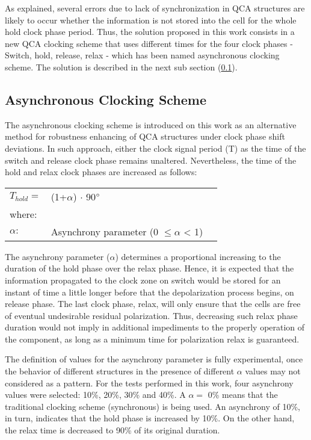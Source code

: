 As explained, several errors due to lack of synchronization in QCA structures are likely to occur whether the information is not stored into the cell for the whole hold clock phase period. Thus, the solution proposed in this work consists in a new QCA clocking scheme that uses different times for the four clock phases - Switch, hold, release, relax - which has been named asynchronous clocking scheme. The solution is described in the next sub section (\ref{Asynchronous_Clocking_Scheme}).

\subsection{Asynchronous Clocking Scheme}
\label{Asynchronous_Clocking_Scheme}

The asynchronous clocking scheme is introduced on this work as an alternative method for robustness enhancing of QCA structures under clock phase shift deviations. In such approach, either the clock signal period (T) as the time of the switch and release clock phase remains unaltered. Nevertheless, the time of the hold and relax clock phases are increased as follows:

\begin{tabular}[H]{lll}
$T_{hold} = $ & (1+$\alpha$) $\cdot$ 90$\degree$ &  \\
where: & & \\
$\alpha : $ & Asynchrony parameter (0 $\leq \alpha$ < 1) &  \\
\end{tabular}

The asynchrony parameter ($\alpha$) determines a proportional increasing to the duration of the hold phase over the relax phase. Hence, it is expected that the information propagated to the clock zone on switch would be stored for an instant of time a little longer before that the depolarization process begins, on release phase. The last clock phase, relax, will only ensure that the cells are free of eventual undesirable residual polarization. Thus, decreasing such relax phase duration would not imply in additional impediments to the properly operation of the component, as long as a minimum time for polarization relax is guaranteed.

The definition of values for the asynchrony parameter is fully experimental, once the behavior of different structures in the presence of different $\alpha$ values may not considered as a pattern. For the tests performed in this work, four asynchrony values were selected: 10\%, 20\%, 30\% and 40\%. A $\alpha =$ 0\% means that the traditional clocking scheme (synchronous) is being used. An asynchrony of 10\%, in turn, indicates that the hold phase is increased by 10\%. On the other hand, the relax time is decreased to 90\% of its original duration.

